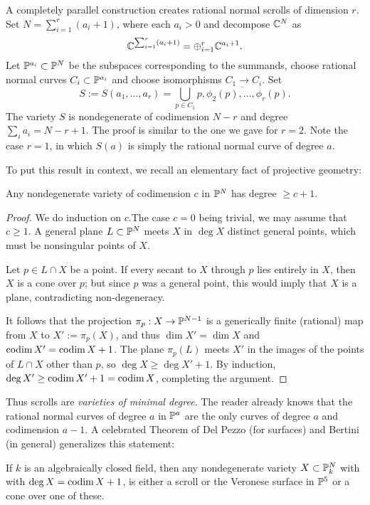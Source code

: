 A completely parallel construction creates rational normal scrolls of dimension $r$. Set $N = \sum_{i=1}^{r}(a_{i}+1)$, where each $a_{i}>0$ and
decompose $\CC^{N}$ as
$$
\CC^{\sum_{i=1}^{r}(a_{i}+1)} = \oplus_{i=1}^{r}\CC^{a_{i}+1}.
$$
Let $\PP^{a_{i}}\subset \PP^{N}$ be the subspaces corresponding to the summands,  choose
rational normal curves $C_{i}\subset \PP^{a_{i}}$ and choose isomorphisms $C_{1}\to C_{i}$. 
Set
$$
S:=S(a_{1}, \dots, a_{r}) = \bigcup_{p\in C_{1}}\overline{p, \phi_{2}(p), \dots, \phi_{r}(p)}.
$$
The variety $S$ is nondegenerate of codimension $N-r$ and degree $\sum_{i}a_{i} = N-r+1$. The proof is similar to the one we gave for $r=2$.
Note the case $r=1$, in which $S(a)$ is simply the rational normal curve of degree $a$. 

To put this result in context, we recall an elementary fact of projective geometry:
 
\begin{proposition}\label{minimal degree}
 Any nondegenerate variety of codimension $c$ in $\PP^{N}$ has degree $\geq c +1$.
\end{proposition}

\begin{proof} We do induction on $c$.The case $c=0$ being trivial,
 we may assume that $c\geq1$. A general plane $L\subset \PP^{N}$ meets $X$ in $\deg X$
 distinct general points, which must be nonsingular points of $X$.
 
Let $p\in L\cap X$ be a point. If every secant to $X$ through $p$ lies entirely in $X$, then $X$ is a cone over $p$; but since $p$ was a general point, this would imply that $X$ is a plane, contradicting non-degeneracy. 

It follows that the projection $\pi_{p}:X \to \PP^{N-1}$ is a generically finite (rational) map from $X$ to $X' := \pi_{p}(X)$,
and thus $\dim X' = \dim X$ and $\codim X' = \codim X+1$. The plane 
$\pi_{p}(L)$ meets $X'$ in the images of the points of $L\cap X$ other than $p$, so
$\deg X\geq \deg X'+1$. By induction, $\deg X' \geq \codim X'+1 = \codim X$, completing the argument.
\end{proof}

Thus scrolls are \emph{varieties of minimal degree}. The reader already knows that the rational normal curves of degree $a$ in $\PP^{a}$ are the only curves of degree $a$ and codimension $a-1$. A celebrated Theorem of Del Pezzo (for surfaces) and Bertini (in general) generalizes this statement:

\begin{theorem}\label{classification of scrolls} If $k$ is an algebraically closed field, then
any nondegenerate variety $X\subset \PP_{k}^{N}$ with with $\deg X = \codim X+1$, is either a scroll or the Veronese surface in $\PP^{5}$ or a cone over one of these.
\end{theorem}

